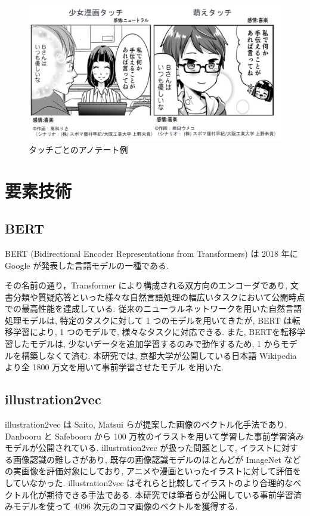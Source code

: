 \documentclass[twocolumn]{jarticle}     %
\begin{document}
\begin{figure}[t]
  \centering
  \includegraphics[width=\linewidth]{4koma.png}
  \caption{タッチごとのアノテート例}
  \label{fig:4koma}
\end{figure}

\section{要素技術}
\subsection{BERT}
BERT (Bidirectional Encoder Representations from Transformers)\cite{BERT} は 2018 年に Google が発表した言語モデルの一種である.

その名前の通り，Transformer により構成される双方向のエンコーダであり, 文書分類や質疑応答といった様々な自然言語処理の幅広いタスクにおいて公開時点での最高性能を達成している.
従来のニューラルネットワークを用いた自然言語処理モデルは, 特定のタスクに対して 1 つのモデルを用いてきたが, BERT は転移学習により, 1 つのモデルで, 様々なタスクに対応できる. また, BERTを転移学習したモデルは, 少ないデータを追加学習するのみで動作するため, 1 からモデルを構築しなくて済む. 本研究では, 京都大学が公開している日本語 Wikipedia より全 1800 万文を用いて事前学習させたモデル\cite{kyoto-bert} を用いた.

\subsection{illustration2vec}
illustration2vec \cite{i2v} は Saito, Matsui らが提案した画像のベクトル化手法であり, Danbooru と Safebooru から 100 万枚のイラストを用いて学習した事前学習済みモデルが公開されている. illustration2vec が扱った問題として, イラストに対する画像認識の難しさがあり, 既存の画像認識モデルのほとんどが ImageNet などの実画像を評価対象にしており, アニメや漫画といったイラストに対して評価をしていなかった. illustration2vec はそれらと比較してイラストのより合理的なベクトル化が期待できる手法である. 本研究では筆者らが公開している事前学習済みモデルを使って 4096 次元のコマ画像のベクトルを獲得する.
\end{document}
